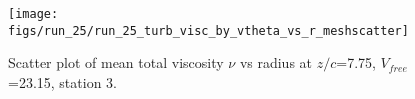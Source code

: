 \begin{figure}[H]
\centering
\texttt{[image: figs/run\_25/run\_25\_turb\_visc\_by\_vtheta\_vs\_r\_meshscatter]}
\caption{Scatter plot of mean total viscosity $\nu$ vs radius at $z/c$=7.75, $V_{free}$=23.15, station 3.}
\label{fig:run_25_turb_visc_by_vtheta_vs_r_meshscatter}
\end{figure}


